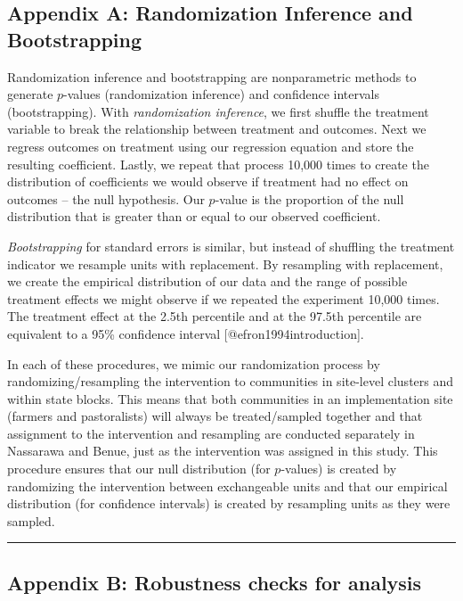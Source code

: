 \documentclass[
]{article}
\begin{document}
\hypertarget{appendix-a-randomization-inference-and-bootstrapping}{%
\subsection{Appendix A: Randomization Inference and
Bootstrapping}\label{appendix-a-randomization-inference-and-bootstrapping}}

Randomization inference and bootstrapping are nonparametric methods to
generate \(p\)-values (randomization inference) and confidence intervals
(bootstrapping). With \emph{randomization inference}, we first shuffle
the treatment variable to break the relationship between treatment and
outcomes. Next we regress outcomes on treatment using our regression
equation and store the resulting coefficient. Lastly, we repeat that
process 10,000 times to create the distribution of coefficients we would
observe if treatment had no effect on outcomes -- the null hypothesis.
Our \(p\)-value is the proportion of the null distribution that is
greater than or equal to our observed coefficient.

\emph{Bootstrapping} for standard errors is similar, but instead of
shuffling the treatment indicator we resample units with replacement. By
resampling with replacement, we create the empirical distribution of our
data and the range of possible treatment effects we might observe if we
repeated the experiment 10,000 times. The treatment effect at the 2.5th
percentile and at the 97.5th percentile are equivalent to a 95\%
confidence interval {[}@efron1994introduction{]}.

In each of these procedures, we mimic our randomization process by
randomizing/resampling the intervention to communities in site-level
clusters and within state blocks. This means that both communities in an
implementation site (farmers and pastoralists) will always be
treated/sampled together and that assignment to the intervention and
resampling are conducted separately in Nassarawa and Benue, just as the
intervention was assigned in this study. This procedure ensures that our
null distribution (for \(p\)-values) is created by randomizing the
intervention between exchangeable units and that our empirical
distribution (for confidence intervals) is created by resampling units
as they were sampled.

\begin{center}\rule{0.5\linewidth}{0.5pt}\end{center}

\hypertarget{appendix-b-robustness-checks-for-analysis}{%
\subsection{Appendix B: Robustness checks for
analysis}\label{appendix-b-robustness-checks-for-analysis}}
\end{document}
